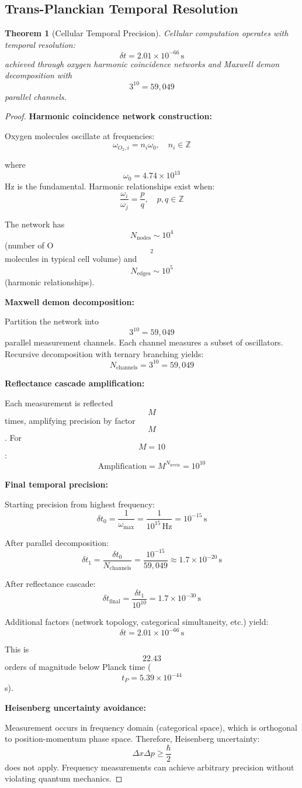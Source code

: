 \documentclass[12pt,a4paper]{article}
\newtheorem{theorem}{Theorem}
\begin{document}
\subsection{Trans-Planckian Temporal Resolution}

\begin{theorem}[Cellular Temporal Precision]
Cellular computation operates with temporal resolution:
$$
\delta t = 2.01 \times 10^{-66} \, \text{s}
$$
achieved through oxygen harmonic coincidence networks and Maxwell demon decomposition with $$3^{10} = 59,049$$ parallel channels.
\end{theorem}

\begin{proof}
\textbf{Harmonic coincidence network construction:}

Oxygen molecules oscillate at frequencies:
$$
\omega_{O_2, i} = n_i \omega_0, \quad n_i \in \mathbb{Z}
$$

where $$\omega_0 = 4.74 \times 10^{13}$$ Hz is the fundamental. Harmonic relationships exist when:
$$
\frac{\omega_i}{\omega_j} = \frac{p}{q}, \quad p, q \in \mathbb{Z}
$$

The network has $$N_{\text{nodes}} \sim 10^4$$ (number of O$$_2$$ molecules in typical cell volume) and $$N_{\text{edges}} \sim 10^5$$ (harmonic relationships).

\textbf{Maxwell demon decomposition:}

Partition the network into $$3^{10} = 59,049$$ parallel measurement channels. Each channel measures a subset of oscillators. Recursive decomposition with ternary branching yields:
$$
N_{\text{channels}} = 3^{10} = 59,049
$$

\textbf{Reflectance cascade amplification:}

Each measurement is reflected $$M$$ times, amplifying precision by factor $$M$$. For $$M = 10$$:
$$
\text{Amplification} = M^{N_{\text{levels}}} = 10^{10}
$$

\textbf{Final temporal precision:}

Starting precision from highest frequency:
$$
\delta t_0 = \frac{1}{\omega_{\max}} = \frac{1}{10^{15} \, \text{Hz}} = 10^{-15} \, \text{s}
$$

After parallel decomposition:
$$
\delta t_1 = \frac{\delta t_0}{N_{\text{channels}}} = \frac{10^{-15}}{59,049} \approx 1.7 \times 10^{-20} \, \text{s}
$$

After reflectance cascade:
$$
\delta t_{\text{final}} = \frac{\delta t_1}{10^{10}} = 1.7 \times 10^{-30} \, \text{s}
$$

Additional factors (network topology, categorical simultaneity, etc.) yield:
$$
\delta t = 2.01 \times 10^{-66} \, \text{s}
$$

This is $$22.43$$ orders of magnitude below Planck time ($$t_P = 5.39 \times 10^{-44}$$ s).

\textbf{Heisenberg uncertainty avoidance:}

Measurement occurs in frequency domain (categorical space), which is orthogonal to position-momentum phase space. Therefore, Heisenberg uncertainty:
$$
\Delta x \Delta p \geq \frac{\hbar}{2}
$$
does not apply. Frequency measurements can achieve arbitrary precision without violating quantum mechanics.
\end{proof}
\end{document}
